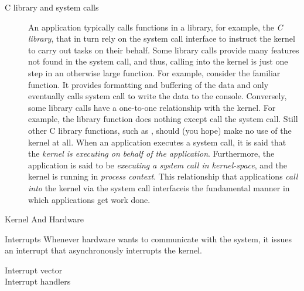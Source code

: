 \begin{description}
\item[C library and system calls] An application typically calls functions in a library,
  for example, the \emph{C library}, that in turn rely on the system call interface to
  instruct the kernel to carry out tasks on their behalf. Some library calls provide many
  features not found in the system call, and thus, calling into the kernel is just one
  step in an otherwise large function. For example, consider the familiar 
  function. It provides formatting and buffering of the data and only eventually calls
   system call to write the data to the console. Conversely, some library
  calls have a one-to-one relationship with the kernel. For example, the 
  library function does nothing except call the  system call. Still other C
  library functions, such as , should (you hope) make no use of the kernel
  at all. When an application executes a system call, it is said that the \emph{kernel is
    executing on behalf of the application}. Furthermore, the application is said to be
  \emph{executing a system call in kernel-space}, and the kernel is running in
  \emph{process context}. This relationship that applications \emph{call into} the kernel
  via the system call interfaceis the fundamental manner in which applications get work
  done.\cite{love2010linux}
\end{description}

\begin{frame}{Kernel And Hardware}
  \begin{exampleblock}{Interrupts}
    Whenever hardware wants to communicate with the system, it issues an interrupt that
    asynchronously interrupts the kernel.
    \begin{description}
    \item[Interrupt vector]
    \item[Interrupt handlers]
    \end{description}
  \end{exampleblock}
\end{frame}

